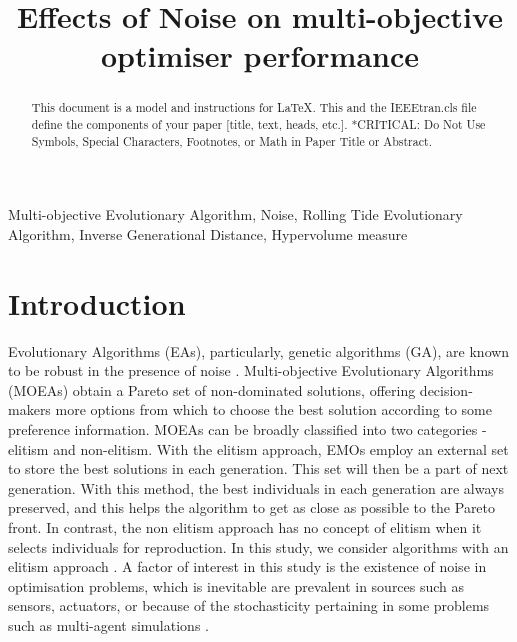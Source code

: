 \documentclass[conference]{IEEEtran}
\begin{document}
\title{Effects of Noise on multi-objective optimiser performance}

\author{
}

\maketitle

\begin{abstract}
This document is a model and instructions for \LaTeX.
This and the IEEEtran.cls file define the components of your paper [title, text, heads, etc.]. *CRITICAL: Do Not Use Symbols, Special Characters, Footnotes, 
or Math in Paper Title or Abstract.
\end{abstract}

\begin{IEEEkeywords}
Multi-objective Evolutionary Algorithm, Noise, Rolling Tide Evolutionary Algorithm, Inverse Generational Distance, Hypervolume measure
\end{IEEEkeywords}

\section{Introduction}
Evolutionary Algorithms (EAs), particularly, genetic algorithms (GA), are known to be robust in the presence of noise \cite{bui2005}. Multi-objective Evolutionary Algorithms (MOEAs) obtain a Pareto set of non-dominated solutions, offering decision-makers more options from which to choose the best solution according to some preference information. MOEAs can be broadly classified into two categories - elitism and non-elitism. With the elitism approach, EMOs employ an external set to store the best solutions in each generation. This set will then be a part of next generation. With this method, the best individuals in each generation are always preserved, and this helps the algorithm to get as close as possible to the Pareto front. In contrast, the non elitism approach has no concept of elitism when it selects individuals for reproduction. In this study, we consider algorithms with an elitism approach \cite{bui2005}. A factor of interest in this study is the existence of noise in optimisation problems, which is inevitable are prevalent in sources such as sensors, actuators, or because of the stochasticity pertaining in some problems such as multi-agent simulations \cite{bui2005}.
\end{document}
